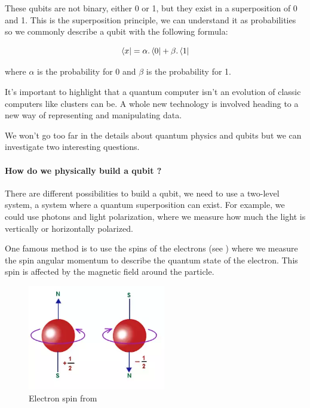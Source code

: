 These qubits are not binary, either 0 or 1, but they exist in a superposition of 0 and 1. This is the superposition principle, we can understand it as probabilities so we commonly describe a qubit with the following formula: \newline

\begin{equation}
  \bra{x} = \alpha . \bra{0} + \beta . \bra{1}
\end{equation}
\medskip

where $\alpha$ is the probability for 0 and $\beta$ is the probability for 1. \newline

It's important to highlight that a quantum computer isn't an evolution of classic computers like clusters can be. A whole new technology is involved heading to a new way of representing and manipulating data. \newline

We won't go too far in the details about quantum physics and qubits but we can investigate two interesting questions. \newline

\paragraph{How do we physically build a qubit ?}

There are different possibilities to build a qubit, we need to use a two-level system, a system where a quantum superposition can exist. For example, we could use photons and light polarization, where we measure how much the light is vertically or horizontally polarized. \newline

One famous method is to use the spins of the electrons (see \cite{spinWiki}) where we measure the spin angular momentum to describe the quantum state of the electron. This spin is affected by the magnetic field around the particle. \newline

\begin{figure}[ht]
\centering
\includegraphics[width=6cm]{Figures/electronSpin}
\caption{Electron spin from \cite{spinNumber}}
\end{figure}
\medskip

